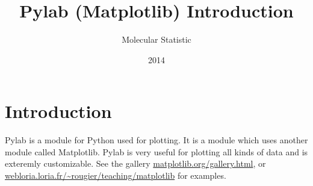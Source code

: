 \documentclass{article}
\title{Pylab (Matplotlib) Introduction}
\author{Molecular Statistic}
\date{2014}
\begin{document}







\maketitle

\section{Introduction}

Pylab is a module for Python used for plotting. It is a module which uses
another module called Matplotlib.  Pylab is very useful for plotting all kinds
of data and is exteremly customizable.  See the gallery
\href{http://matplotlib.org/gallery.html}{matplotlib.org/gallery.html}, or
\href{http://webloria.loria.fr/~rougier/teaching/matplotlib/}{webloria.loria.fr/\~{}rougier/teaching/matplotlib}
for examples. \\
\end{document}
